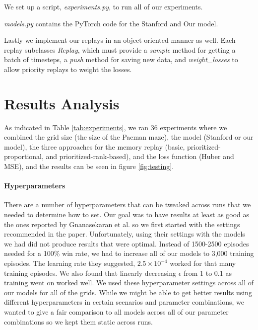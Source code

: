 \documentclass[conference]{IEEEtran}
\begin{document}
We set up a script, \textit{experiments.py}, to run all of our experiments.

\textit{models.py} contains the PyTorch code for the Stanford and Our model.

Lastly we implement our replays in an object oriented manner as well. Each replay subclasses \textit{Replay}, which must provide a \textit{sample} method for getting a batch of timesteps, a \textit{push} method for saving new data, and \textit{weight\_losses} to allow priority replays to weight the losses.

\section{Results Analysis}
As indicated in Table \ref{tab:experiments}, we ran 36 experiments where we combined the grid size (the size of the Pacman maze), the model (Stanford or our model), the three approaches for the memory replay (basic, prioritized-proportional, and prioritized-rank-based), and the loss function (Huber and MSE), and the results can be seen in figure \ref{fig:testing}.

\paragraph{Hyperparameters}
There are a number of hyperparameters that can be tweaked across runs that we needed to determine how to set. Our goal was to have results at least as good as the ones reported by Gnanasekaran et al. \cite{stanford2017} so we first started with the settings recommended in the paper. Unfortunately, using their settings with the models we had did not produce results that were optimal. Instead of 1500-2500 episodes needed for a 100\% win rate, we had to increase all of our models to 3,000 training episodes. The learning rate they suggested, $2.5\times 10^{-4}$ worked for that many training episodes. We also found that linearly decreasing $\epsilon$ from 1 to 0.1 as training went on worked well. We used these hyperparameter settings across all of our models for all of the grids. While we might be able to get better results using different hyperparameters in certain scenarios and parameter combinations, we wanted to give a fair comparison to all models across all of our parameter combinations so we kept them static across runs.
\end{document}
